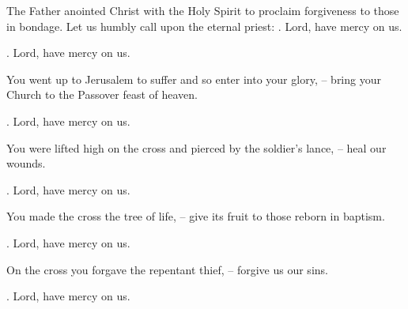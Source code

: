 \lettrine[loversize=0.15,lines=2]{T}{}he Father anointed Christ with the Holy Spirit to proclaim forgiveness to those in bondage. Let us humbly call upon the eternal priest: \Rbar. Lord, have mercy on us.
\par \Rbar. Lord, have mercy on us.

You went up to Jerusalem to suffer and so enter into your glory,
– bring your Church to the Passover feast of heaven.
\par \Rbar. Lord, have mercy on us.

You were lifted high on the cross and pierced by the soldier’s lance,
– heal our wounds.
\par \Rbar. Lord, have mercy on us.

You made the cross the tree of life,
– give its fruit to those reborn in baptism.
\par \Rbar. Lord, have mercy on us.

On the cross you forgave the repentant thief,
– forgive us our sins.
\par \Rbar. Lord, have mercy on us.
